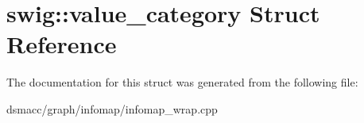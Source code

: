 \hypertarget{structswig_1_1value__category}{}\section{swig\+:\+:value\+\_\+category Struct Reference}
\label{structswig_1_1value__category}


The documentation for this struct was generated from the following file\+:\begin{DoxyCompactItemize}
\item 
dsmacc/graph/infomap/infomap\+\_\+wrap.\+cpp\end{DoxyCompactItemize}
